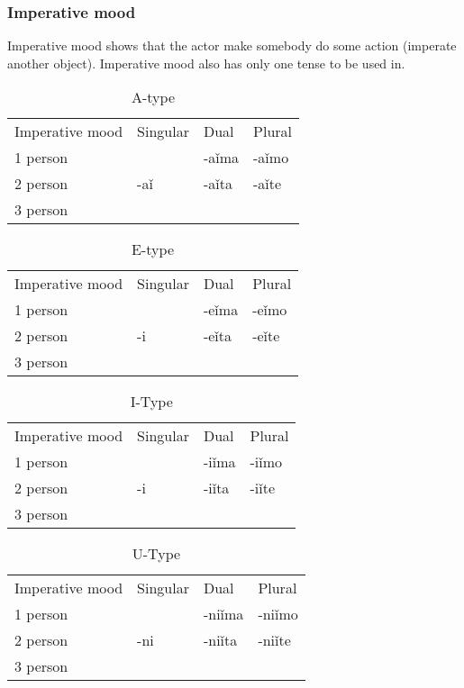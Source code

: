 \subsubsection{Imperative mood}

Imperative mood shows that the actor make somebody do some action (imperate another object). Imperative mood also has only one tense to be used in. 

\begin{table}
	\caption{A-type}
	\begin{tabular}{llll}
		Imperative mood & Singular & Dual & Plural \\
		1 person &  & -aǐma & -aǐmo \\
		2 person & -aǐ & -aǐta & -aǐte \\
		3 person &  &  & 
	\end{tabular}
\end{table}



\begin{table}
	\caption{E-type}
	\begin{tabular}{llll}
		Imperative mood & Singular & Dual & Plural \\
		1 person &  & -eǐma & -eǐmo \\
		2 person & -i & -eǐta & -eǐte \\
		3 person &  &  & 
	\end{tabular}
\end{table}



\begin{table}
	\caption{I-Type}
	\begin{tabular}{llll}
		Imperative mood & Singular & Dual & Plural \\
		1 person &  & -iǐma & -iǐmo \\
		2 person & -i & -iǐta & -iǐte \\
		3 person &  &  & 
	\end{tabular}
\end{table}

\begin{table}
	\caption{U-Type}
	\begin{tabular}{llll}
		Imperative mood & Singular & Dual & Plural \\
		1 person &  & -niǐma & -niǐmo \\
		2 person & -ni & -niǐta & -niǐte \\
		3 person &  &  & 
	\end{tabular}
\end{table}


